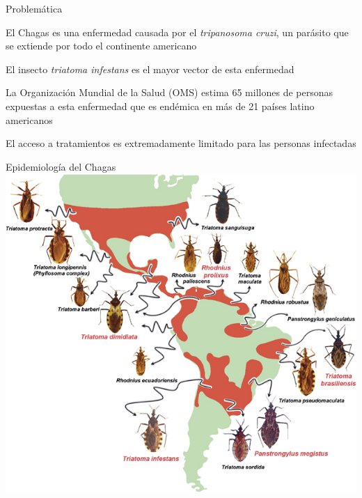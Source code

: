 \documentclass{beamer}
\begin{document}
\begin{frame}{Problemática}

			El Chagas es una enfermedad causada por el \textit{tripanosoma cruzi}, un parásito que se extiende por todo el continente americano

			\medskip  El insecto \textit{triatoma infestans} es el mayor vector de esta enfermedad

			\medskip  La Organización Mundial de la Salud (OMS) estima 65 millones de personas expuestas a esta enfermedad que es endémica en más de 21 países latino americanos

			\medskip El acceso a tratamientos es extremadamente limitado para las personas infectadas

\end{frame}


\begin{frame}{Epidemiología del Chagas}
			\includegraphics[height=.9\textheight]{slides/triatomine-map.jpg}
\end{frame}
\end{document}
